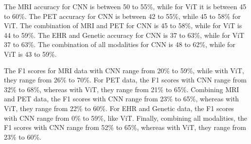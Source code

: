 The MRI accuracy for CNN is between 50 to 55\%, while for ViT it is between 45 to 60\%. The PET accuracy for CNN is between 42 to 55\%, while 45 to 58\% for ViT. The combination of MRI and PET for CNN is 45 to 58\%, while for ViT is 44 to 59\%. The EHR and Genetic accuracy for CNN is 37 to 63\%, while for ViT 37 to 63\%. The combination of all modalities for CNN is 48 to 62\%, while for ViT is 43 to 59\%.  

The F1 scores for MRI data with CNN range from 20\% to 59\%, while with ViT, they range from 26\% to 70\%. For PET data, the F1 scores with CNN range from 32\% to 68\%, whereas with ViT, they range from 21\% to 65\%. Combining MRI and PET data, the F1 scores with CNN range from 23\% to 65\%, whereas with ViT, they range from 22\% to 60\%. For EHR and Genetic data, the F1 scores with CNN range from 0\% to 59\%, like ViT. Finally, combining all modalities, the F1 scores with CNN range from 52\% to 65\%, whereas with ViT, they range from 23\% to 60\%. 

